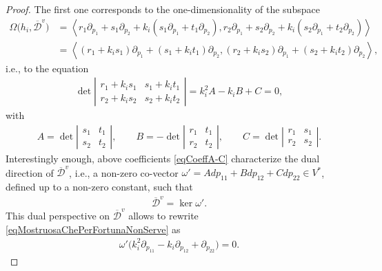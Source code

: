 \documentclass[pdftex]{sigma}
\newcommand{\D}{\mathcal{D}}
\newcommand{\Span}[1]{\left\langle #1 \right\rangle}
\numberwithin{equation}{section}
\begin{document}
\begin{proof}
The f\/irst one corresponds to the one-dimensionality of the subspace
\begin{align}
 \Omega\big(h_i,\overline{\D}^v\big)&=\Span{r_1\partial_{p_{1}}+s_1 \partial_{p_{2}}+k_i(s_1 \partial_{p_{1}}+t_1 \partial_{p_{2}}),r_2\partial_{p_{1}}+s_2 \partial_{p_{2}}+k_i(s_2 \partial_{p_{1}}+t_2 \partial_{p_{2}})}\nonumber\\
 &=\Span{(r_1+k_is_1)\partial_{p_{1}}+(s_1+k_it_1) \partial_{p_{2}}, (r_2+k_is_2)\partial_{p_{1}}+(s_2+k_it_2) \partial_{p_{2}}},\label{eqOmegaHDiPrimo}
\end{align}
i.e., to the equation
\begin{gather}\label{eqMostruosaChePerFortunaNonServe}
\det \left|\begin{matrix}r_1+k_is_1 & s_1+k_it_1 \\r_2+k_is_2 & s_2+k_it_2\end{matrix}\right| = k_i^2 A -k_i B + C =0,
\end{gather}
with
\begin{gather}\label{eqCoeffA-C}
A= \det\left|\begin{matrix}s_1 & t_1 \\s_2 & t_2\end{matrix}\right|, \qquad %
B= - \det\left|\begin{matrix}r_1 & t_1 \\r_2 & t_2\end{matrix}\right|,\qquad %
C= \det\left|\begin{matrix}r_1 & s_1 \\r_2 & s_2\end{matrix}\right|. %
\end{gather}
Interestingly  enough, above coef\/f\/icients \eqref{eqCoeffA-C} characterize the dual direction of $\overline{\D}^v$, i.e., a non-zero co-vector $\omega'=Adp_{11}+Bdp_{12}+Cdp_{22}\in V^\ast$, def\/ined up to a non-zero constant, such that
\begin{gather}\label{Dvprimodual}
\overline{\D}^v=\ker \omega'.
\end{gather}
This dual perspective on $\overline{\D}^v$ allows to rewrite \eqref{eqMostruosaChePerFortunaNonServe} as
\begin{gather}\label{eqMostruosaChePerFortunaNonServeMigliore}
\omega'\big(k_i^2\partial_{p_{11}}-k_i\partial_{p_{12}}+ \partial_{p_{22}}\big)=0.
\end{gather}

\end{proof}
\end{document}
